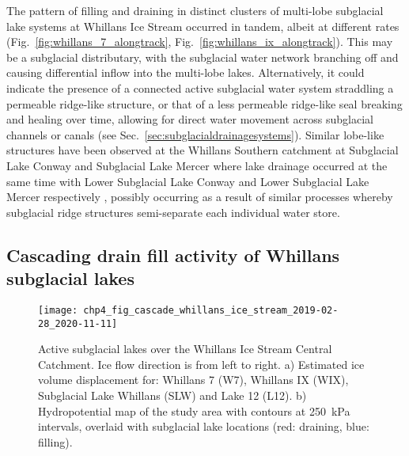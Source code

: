 The pattern of filling and draining in distinct clusters of multi-lobe subglacial lake systems at Whillans Ice Stream occurred in tandem, albeit at different rates (Fig.~\ref{fig:whillans_7_alongtrack}, Fig.~\ref{fig:whillans_ix_alongtrack}).
This may be a subglacial distributary, with the subglacial water network branching off and causing differential inflow into the multi-lobe lakes.
Alternatively, it could indicate the presence of a connected active subglacial water system straddling a permeable ridge-like structure, or that of a less permeable ridge-like seal breaking and healing over time, allowing for direct water movement across subglacial channels or canals (see Sec.~\ref{sec:subglacialdrainagesystems}).
Similar lobe-like structures have been observed at the Whillans Southern catchment at Subglacial Lake Conway and Subglacial Lake Mercer where lake drainage occurred at the same time with Lower Subglacial Lake Conway and Lower Subglacial Lake Mercer respectively \citep{SiegfriedIlluminatingactivesubglacial2021}, possibly occurring as a result of similar processes whereby subglacial ridge structures semi-separate each individual water store.




\subsection{Cascading drain fill activity of Whillans subglacial lakes} \label{sec:cascade}

\begin{figure}[htbp]
  \texttt{[image: chp4\_fig\_cascade\_whillans\_ice\_stream\_2019-02-28\_2020-11-11]}
  \caption[Ice Volume displacement over Whillans Ice Stream Central Catchment lakes]{
    Active subglacial lakes over the Whillans Ice Stream Central Catchment.
    Ice flow direction is from left to right.
    a) Estimated ice volume displacement for: Whillans 7 (W7), Whillans IX (WIX), Subglacial Lake Whillans (SLW) and Lake 12 (L12).
    b) Hydropotential map of the study area with contours at \SI{250}{\kilo\pascal} intervals, overlaid with subglacial lake locations (red: draining, blue: filling).
  }
  \label{fig:cascade}
\end{figure}

